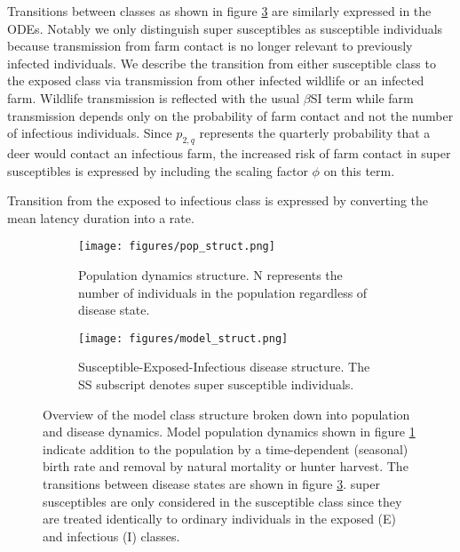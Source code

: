 \documentclass[number,preprint,review,12pt]{elsarticle}
\begin{document}
Transitions between classes as shown in figure \ref{dis_fig} are similarly expressed in the ODEs. Notably we only distinguish super susceptibles as susceptible individuals because transmission from farm contact is no longer relevant to previously infected individuals. We describe the transition from either susceptible class to the exposed class via transmission from other infected wildlife or an infected farm. Wildlife transmission is reflected with the usual $\beta$SI term while farm transmission depends only on the probability of farm contact and not the number of infectious individuals. Since $p_{2,q}$ represents the quarterly probability that a deer would contact an infectious farm, the increased risk of farm contact in super susceptibles is expressed by including the scaling factor $\phi$ on this term.

Transition from the exposed to infectious class is expressed by converting the mean latency duration into a rate.

\begin{figure}
\centering
\begin{subfigure}[t]{0.6\textwidth}
\centering
\texttt{[image: figures/pop\_struct.png]} 
\caption{Population dynamics structure. N represents the number of individuals in the population regardless of disease state.} \label{pop_fig}
\end{subfigure}

\begin{subfigure}[t]{0.6\textwidth}
\centering
\texttt{[image: figures/model\_struct.png]} 
\caption{Susceptible-Exposed-Infectious disease structure. The SS subscript denotes super susceptible individuals.} \label{dis_fig}
\end{subfigure}

 \caption{Overview of the model class structure broken down into population and disease dynamics. Model population dynamics shown in figure \ref{pop_fig} indicate addition to the population by a time-dependent (seasonal) birth rate and removal by natural mortality or hunter harvest. The transitions between disease states are shown in figure \ref{dis_fig}. super susceptibles are only considered in the susceptible class since they are treated identically to ordinary individuals in the exposed (E) and infectious (I) classes.}

\end{figure}
\end{document}
